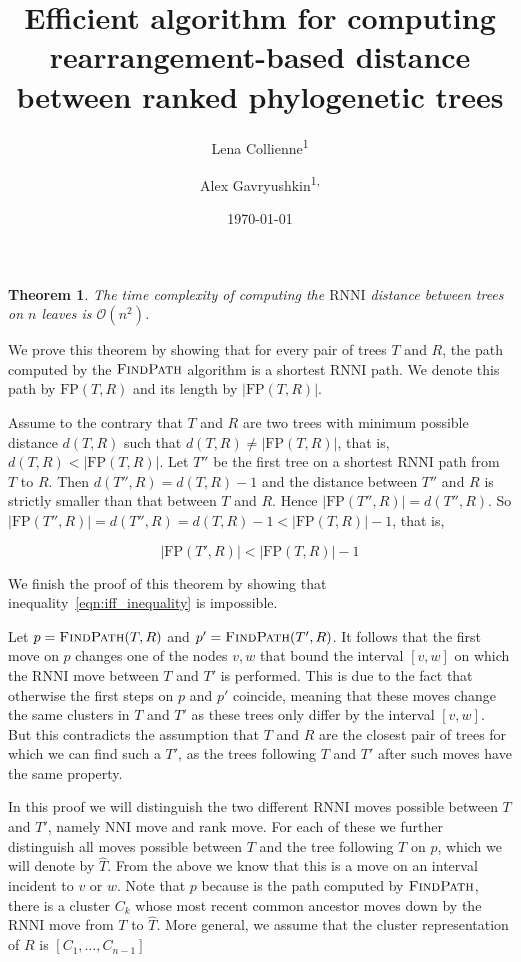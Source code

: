 \documentclass{amsart}
\title[$\rnni$ Distance]{Efficient algorithm for computing rearrangement-based distance between ranked phylogenetic trees}
\date{\today}
\author{Lena Collienne\textsuperscript{1}}
\author{Alex Gavryushkin\textsuperscript{1, \Letter}}
\newtheorem{theorem}{Theorem}
\newcommand{\rnni}{\mathrm{RNNI}}
\newcommand{\findpath}{\textsc{FindPath}}
\newcommand{\nni}{\mathrm{NNI}}
\newcommand{\fp}{\mathrm{FP}}
\renewcommand{\O}{\mathcal O}
\begin{document}
\begin{abstract}
\end{abstract}


\maketitle

\begin{theorem}
The time complexity of computing the $\rnni$ distance between trees on $n$ leaves is $\O(n^2)$.
\end{theorem}

\proof
We prove this theorem by showing that for every pair of trees $T$ and $R$, the path computed by the $\findpath$ algorithm is a shortest $\rnni$ path.
We denote this path by $\fp(T, R)$ and its length by $|\fp(T, R)|$.

Assume to the contrary that $T$ and $R$ are two trees with minimum possible distance $d(T, R)$ such that $d(T,R) \neq |\fp(T,R)|$, that is, $d(T,R) < |\fp(T,R)|$.
Let $T''$ be the first tree on a shortest $\rnni$ path from $T$ to $R$.
Then $d(T'',R) = d(T, R) - 1$ and the distance between $T''$ and $R$ is strictly smaller than that between $T$ and $R$.
Hence $|\fp(T'',R)| = d(T'', R)$.
So $|\fp(T'',R)| = d(T'', R) =  d(T, R) - 1 < |\fp(T,R)| - 1$, that is,

\begin{equation}
|\fp(T',R)| < |\fp(T,R)| - 1
\label{eqn:iff_inequality}
\end{equation}

We finish the proof of this theorem by showing that inequality~\ref{eqn:iff_inequality} is impossible.

Let $p = \findpath(T,R)$ and $p' = \findpath(T', R)$.
It follows that the first move on $p$ changes one of the nodes $v, w$ that bound the interval $[v,w]$ on which the $\rnni$ move between $T$ and $T'$ is performed.
This is due to the fact that otherwise the first steps on $p$ and $p'$ coincide, meaning that these moves change the same clusters in $T$ and $T'$ as these trees only differ by the interval $[v,w]$.
But this contradicts the assumption that $T$ and $R$ are the closest pair of trees for which we can find such a $T'$, as the trees following $T$ and $T'$ after such moves have the same property.

In this proof we will distinguish the two different $\rnni$ moves possible between $T$ and $T'$, namely $\nni$ move and rank move.
For each of these we further distinguish all moves possible between $T$ and the tree following $T$ on $p$, which we will denote by $\hat T$.
From the above we know that this is a move on an interval incident to $v$ or $w$.
Note that $p$ because is the path computed by $\findpath$, there is a cluster $C_k$ whose most recent common ancestor moves down by the $\rnni$ move from $T$ to $\hat T$.
More general, we assume that the cluster representation of $R$ is $[C_1, \ldots, C_{n-1}]$
\end{document}
